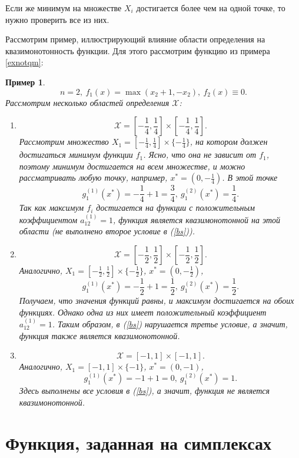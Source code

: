 \documentclass{article}
\newtheorem{example}{Пример}
\theoremstyle{definition}
\begin{document}
 Если же минимум на множестве \(X_i\) достигается более чем на одной точке, то нужно проверить все из них.

Рассмотрим пример, иллюстрирующий влияние области определения на квазимонотонность функции. Для этого рассмотрим функцию из примера \ref{exnotqm}:
\begin{example}
	\[n = 2,\ f_1(x) = \max(x_2 + 1, -x_2),\ f_2(x) \equiv 0.\]
	Рассмотрим несколько областей определения \(\mathcal{X}\):
	\begin{enumerate}
		\item 
		\[
			\mathcal{X} = [-\frac{1}{4},\frac{1}{4}] \times [-\frac{1}{4},\frac{1}{4}].
		\]
		Рассмотрим множество \(X_1 = [-\frac{1}{4},\frac{1}{4}] \times \{-\frac{1}{4}\} \), на котором должен достигаться минимум функции \(f_1\). Ясно, что она не зависит от \(f_1\), поэтому минимум достигается на всем множестве, и можно рассматривать любую точку, например, \(x^* = (0, -\frac{1}{4})\). В этой точке
		\[
			g_1^{(1)}(x^*) = -\frac{1}{4} + 1 = \frac{3}{4},\ g_1^{(2)}(x^*) = \frac{1}{4}.
		\]
		Так как максимум \(f_i\) достигается на функции с положительным коэффициентом \(a_{12}^{(1)} = 1\), функция является квазимонотонной на этой области (не выполнено второе условие в (\ref{bs})).
		
		\item 
		\[
			\mathcal{X} = [-\frac{1}{2},\frac{1}{2}] \times [-\frac{1}{2},\frac{1}{2}].
		\]
		Аналогично, \(X_1 = [-\frac{1}{2},\frac{1}{2}] \times \{-\frac{1}{2}\} \), \(x^* = (0, -\frac{1}{2})\),
		\[
			g_1^{(1)}(x^*) = -\frac{1}{2} + 1 = \frac{1}{2},\ g_1^{(2)}(x^*) = \frac{1}{2}.
		\]
		Получаем, что значения функций равны, и максимум достигается на обоих функциях. Однако одна из них имеет положительный коэффициент \(a_{12}^{(1)} = 1\). Таким образом, в (\ref{bs}) нарушается третье условие, а значит, функция также является квазимонотонной.
		
		\item 
		\[
			\mathcal{X} = [-1, 1] \times [-1, 1].
		\]
		Аналогично, \(X_1 = [-1,1] \times \{-1\} \), \(x^* = (0, -1)\),
		\[
			g_1^{(1)}(x^*) = -1 + 1 = 0,\ g_1^{(2)}(x^*) = 1.
		\]
		Здесь выполнены все условия в (\ref{bs}), а значит, функция не является квазимонотонной.
	\end{enumerate}
\end{example}

\section{Функция, заданная на симплексах}
\end{document}
